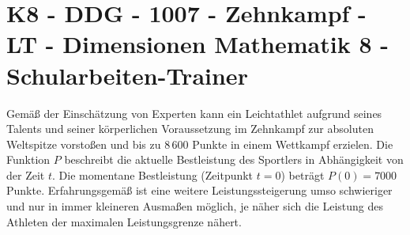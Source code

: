 \section{K8 - DDG - 1007 - Zehnkampf - LT - Dimensionen Mathematik 8 - Schularbeiten-Trainer}

\begin{beispiel}[K8 - DDG]{1}
Gemäß der Einschätzung von Experten kann ein Leichtathlet aufgrund seines Talents und seiner körperlichen Voraussetzung im Zehnkampf zur absoluten Weltspitze vorstoßen und bis zu 8\,600 Punkte in einem Wettkampf erzielen. Die Funktion $P$ beschreibt die aktuelle Bestleistung des Sportlers in Abhängigkeit von der Zeit $t$. Die momentane Bestleistung (Zeitpunkt $t=0$) beträgt $P(0)=7000$ Punkte. Erfahrungsgemäß ist eine weitere Leistungssteigerung umso schwieriger und nur in immer kleineren Ausmaßen möglich, je näher sich die Leistung des Athleten der maximalen Leistungsgrenze nähert.

\end{beispiel}